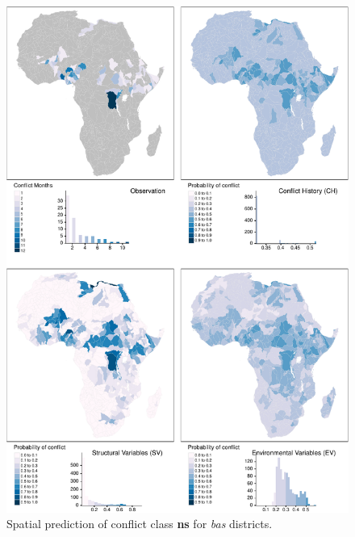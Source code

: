 \documentclass[a4paper,11pt]{article}
\begin{document}
\begin{tiny}
\begin{figure}[H]
{\centering \includegraphics{thesis_files/figure-latex/appendix-spatial-bas-ns-1} 

}

\caption[Spatial prediction of conflict class \textbf{ns} for \textit{bas} districts.]{Spatial prediction of conflict class \textbf{ns} for \textit{bas} districts.}\label{fig:appendix-spatial-bas-ns}
\end{figure}
\begin{figure}[H]


\end{figure}
\end{tiny}
\end{document}
